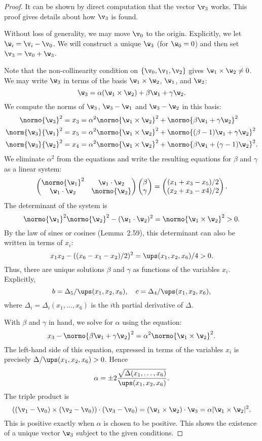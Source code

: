 \begin{proof}
It can be shown by direct computation that the vector $\v_3$ works.  This proof gives details about how
$\v_3$ is found.

Without loss of generality, we may move $\v_0$ to the origin.  Explicitly,
we let $\w_i = \v_i - \v_0$.  We will construct a unique $\w_3$ (for $\w_0=0$) and then set $\v_3 = \v_0 + \w_3$.

Note that the non-collinearity condition on $\{\v_0,\v_1,\v_2\}$ gives $\w_1\times\w_2\ne 0$.
We may write $\w_3$ in terms of the basis $\w_1\times\w_2$, $\w_1$, and $\w_2$:
\[
\w_3 = \alpha (\w_1\times \w_2) + \beta \w_1 + \gamma \w_2.
\]
We compute the norms of $\w_3$, $\w_3 - \w_1$ and $\w_3-\w_2$ in this basis:
\begin{align*}
\normo{\w_3}^2 = x_3 &= \alpha^2 \normo{\w_1\times\w_2}^2 + \normo{\beta\w_1+\gamma\w_2}^2 \\
\norm{\w_3}{\w_1}^2 = x_5 &= \alpha^2 \normo{\w_1\times\w_2}^2 + \normo{(\beta-1)\w_1 + \gamma\w_2}^2\\
\norm{\w_3}{\w_2}^2 = x_4 &= \alpha^2\normo{\w_1\times\w_2}^2 +\normo{\beta\w_1 + (\gamma-1)\w_2}^2.
\end{align*}
We eliminate $\alpha^2$ from the equations and write the resulting equations for $\beta$ and $\gamma$ as
a linear system:
\[
\left(\begin{matrix} \normo{\w_1}^2 & \w_1\cdot \w_2 \\ \w_1\cdot \w_2 & \normo{\w_2} \end{matrix}\right)
\left(\begin{matrix} \beta \\ \gamma \end{matrix}\right) = 
\left(\begin{matrix} (x_1 + x_3 - x_5)/2 \\ (x_2 + x_3 - x4)/2 \end{matrix}\right).
\]
The determinant of the system is 
\[
\normo{\w_1}^2\normo{\w_2}^2 - (\w_1\cdot \w_2)^2 = \normo{\w_1\times \w_2}^2 >  0.
\]
By the law of sines or cosines (Lemma~2.59), this determinant can also be written in terms of $x_i$:
\[
x_1 x_2 - ((x_6 - x_1 - x_2)/2)^2 = \ups(x_1,x_2,x_6)/4 > 0.
\]
Thus, there are unique solutions $\beta$ and $\gamma$ as functions of the variables $x_i$. Explicitly,
\[
b = \Delta_5/\ups(x_1,x_2,x_6),\quad c = \Delta_4/\ups(x_1,x_2,x_6),
\]
where $\Delta_i=\Delta_i(x_1,\ldots,x_6)$ is the $i$th partial derivative of $\Delta$.

With $\beta$ and $\gamma$ in hand, we solve for $\alpha$ using the equation:
\[
x_3 - \normo{\beta\w_1 + \gamma\w_2}^2 = \alpha^2 \normo{\w_1\times \w_2}^2.
\]
The left-hand side of this equation, expressed in terms of the variables $x_i$ is precisely $\Delta/\ups(x_1,x_2,x_6) >0$.
Hence 
\[
\alpha = \pm 2\frac{\sqrt{\Delta(x_1,\ldots,x_6)}} {\ups(x_1,x_2,x_6)}.
\]
The triple product is
\[
((\v_1 - \v_0) \times (\v_2 - \v_0)) \cdot (\v_3 - \v_0) = (\w_1 \times \w_2) \cdot \w_3 = \alpha |\w_1\times \w_2|^2.
\]
This is positive exactly when $\alpha$ is chosen to be positive.
This shows the existence of a unique vector $\w_3$ subject to the given conditions.


\end{proof}
